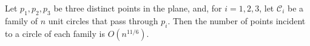 \begin{theorem}
	Let $p_1,p_2,p_3$ be three distinct points in the plane, and, for $i=1,2,3$,
	let $\mathcal{C}_i$ be a family of $n$ unit circles that pass through $p_i$.
	Then the number of points incident to a circle of each family is $O(n^{11/6})$.
\end{theorem}
